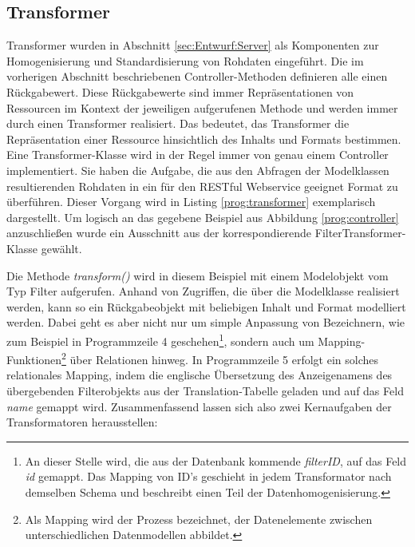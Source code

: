 \subsection{Transformer}
\label{sec:imp:Transformer}

Transformer wurden in Abschnitt \ref{sec:Entwurf:Server} als Komponenten zur Homogenisierung und Standardisierung von Rohdaten eingeführt. Die im vorherigen Abschnitt beschriebenen Controller-Methoden definieren alle einen Rückgabewert. Diese Rückgabewerte sind immer Repräsentationen von Ressourcen im Kontext der jeweiligen aufgerufenen Methode und werden immer durch einen Transformer realisiert. Das bedeutet, das Transformer die Repräsentation einer Ressource hinsichtlich des Inhalts und Formats bestimmen. Eine Transformer-Klasse wird in der Regel immer von genau einem Controller implementiert. Sie haben die Aufgabe, die aus den Abfragen der Modelklassen resultierenden Rohdaten in ein für den RESTful Webservice geeignet Format zu überführen. Dieser Vorgang wird in Listing
\ref{prog:transformer} exemplarisch dargestellt. Um logisch an das gegebene Beispiel aus Abbildung \ref{prog:controller} anzuschließen wurde ein Ausschnitt aus der korrespondierende FilterTransformer-Klasse gewählt. 

\begin{program}[H]
\label{prog:transformer}
\end{program}

Die Methode \emph{transform()} wird in diesem Beispiel mit einem Modelobjekt vom Typ Filter aufgerufen. Anhand von Zugriffen, die über die Modelklasse realisiert werden, kann so ein Rückgabeobjekt mit beliebigen Inhalt und Format modelliert werden. Dabei geht es aber nicht nur um simple Anpassung von Bezeichnern, wie zum Beispiel in Programmzeile 4 geschehen\footnote{An dieser Stelle wird, die aus der Datenbank kommende \emph{filterID}, auf das Feld \emph{id} gemappt. Das Mapping von ID's geschieht in jedem Transformator nach demselben Schema und beschreibt einen Teil der Datenhomogenisierung.}, sondern auch um Mapping-Funktionen\footnote{Als Mapping wird der Prozess bezeichnet, der Datenelemente zwischen unterschiedlichen Datenmodellen abbildet.} über Relationen hinweg. In Programmzeile 5 erfolgt ein solches relationales Mapping, indem die englische Übersetzung des Anzeigenamens des übergebenden Filterobjekts aus der Translation-Tabelle geladen und auf das Feld \emph{name} gemappt wird. Zusammenfassend lassen sich also zwei Kernaufgaben der Transformatoren herausstellen:

